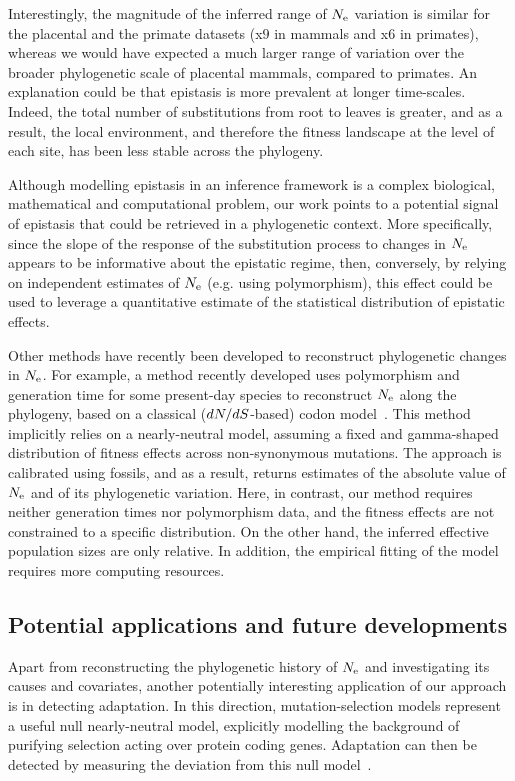 Interestingly, the magnitude of the inferred range of $N_{\text{e}}$ variation is similar for the placental and the primate datasets (x$9$ in mammals and x$6$ in primates), whereas we would have expected a much larger range of variation over the broader phylogenetic scale of placental mammals, compared to primates.
An explanation could be that epistasis is more prevalent at longer time-scales.
Indeed, the total number of \glspl{substitution} from root to leaves is greater, and as a result, the local environment, and therefore the fitness landscape at the level of each site, has been less stable across the phylogeny.

Although modelling epistasis in an inference framework is a complex biological, mathematical and computational problem, our work points to a potential signal of epistasis that could be retrieved in a phylogenetic context.
More specifically, since the slope of the response of the \gls{substitution} process to changes in $N_{\text{e}}$ appears to be informative about the epistatic regime, then, conversely, by relying on independent estimates of $N_{\text{e}}$ (e.g. using polymorphism), this effect could be used to leverage a quantitative estimate of the statistical distribution of epistatic effects.

Other methods have recently been developed to reconstruct phylogenetic changes in $N_{\text{e}}$.
For example, a method recently developed uses polymorphism and generation time for some present-day species to reconstruct $N_{\text{e}}$ along the phylogeny, based on a classical ($dN/dS$-based) \gls{codon} model~\citep{Brevet2019}.
This method implicitly relies on a \gls{nearly-neutral} model, assuming a fixed and gamma-shaped distribution of fitness effects across \gls{non-synonymous} mutations.
The approach is calibrated using fossils, and as a result, returns estimates of the absolute value of $N_{\text{e}}$ and of its phylogenetic variation.
Here, in contrast, our method requires neither generation times nor polymorphism data, and the fitness effects are not constrained to a specific distribution.
On the other hand, the inferred \glspl{effective population size} are only relative.
In addition, the empirical fitting of the model requires more computing resources.

\subsection{Potential applications and future developments}

Apart from reconstructing the phylogenetic history of $N_{\text{e}}$ and investigating its causes and covariates, another potentially interesting application of our approach is in detecting adaptation.
In this direction, mutation-selection models represent a useful null \gls{nearly-neutral} model, explicitly modelling the background of purifying selection acting over protein coding genes.
Adaptation can then be detected by measuring the deviation from this null model~\citep{Rodrigue2016, Bloom2017}.

